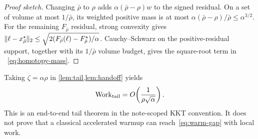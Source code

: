 \begin{proof}[Proof sketch]
Changing $\bar\rho$ to $\rho$ adds
$\alpha(\bar\rho-\rho)w$ to the signed residual.  On a set of volume at most
$1/\bar\rho$, its weighted positive mass is at most
$\alpha(\bar\rho-\rho)/\bar\rho\le\alpha^{3/2}$.  For the remaining
$F_{\bar\rho}$ residual, strong convexity gives
$\lVert\ell-x_{\bar\rho}^\star\rVert_2
 \le\sqrt{2(F_{\bar\rho}(\ell)-F_{\bar\rho}^\star)/\alpha}$.
Cauchy--Schwarz on the positive-residual support, together with its
$1/\bar\rho$ volume budget, gives the square-root term in
~\eqref{eq:homotopy-mass}.
\end{proof}

Taking $\zeta=\alpha\rho$ in \cref{lem:tail,lem:handoff} yields
\begin{equation}
  \operatorname{Work}_{\mathrm{tail}}
  =O\!\left(\frac{1}{\rho\sqrt\alpha}\right).
  \label{eq:tail-target}
\end{equation}
This is an end-to-end tail theorem in the note-scoped KKT convention.  It does
not prove that a classical accelerated warmup can reach~\eqref{eq:warm-gap}
with local work.

